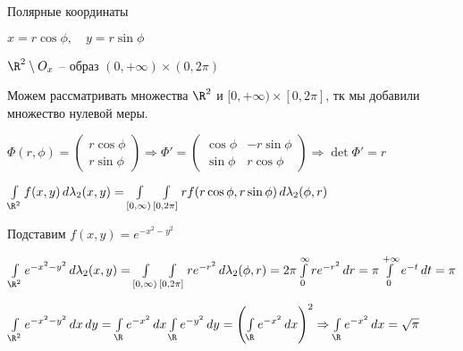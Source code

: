\begin{example}
	Полярные координаты 
	
	$x = r \cos \phi, \quad y = r \sin \phi$
	
	$\R^2 \setminus O_x$ -- образ $(0, +\infty) \times (0, 2\pi)$
	
	Можем рассматривать множества $\R^2$ и $[0, +\infty) \times [0, 2\pi]$, тк мы добавили множество нулевой меры.
	
	$\Phi(r, \phi) = \begin{pmatrix}
	r \cos \phi \\
	r \sin \phi
	\end{pmatrix} \Rightarrow \Phi' = \begin{pmatrix}
	\cos \phi & - r\sin\phi\\
	\sin \phi & r\cos \phi
	\end{pmatrix} \Rightarrow \det \Phi' = r$
	
	$\int\limits_{\R^2} f(x, y) \,d\lambda_2(x, y) = \int\limits_{[0, \infty)} \int\limits_{[0, 2\pi]} r f(r\cos \phi, r \sin \phi) \,d\lambda_2(\phi, r)$
	
	Подставим $f(x, y) = e^{-x^2-y^2}$

	$\int\limits_{\R^2} e^{-x^2-y^2} \,d\lambda_2(x, y) = \int\limits_{[0, \infty)} \int\limits_{[0, 2\pi]} r e^{-r^2} \,d\lambda_2(\phi, r) = 2\pi \int\limits_0^\infty r e^{-r^2} \,dr = \pi \int\limits_{0}^{+\infty} e^{-t}\,dt = \pi$
	
	$\int\limits_{\R^2} e^{-x^2-y^2} \,dx\,dy = \int\limits_{\R} e^{-x^2} \,dx \int\limits_{\R} e^{-y^2} \,dy = \left(\int\limits_{\R} e^{-x^2} \,dx \right)^2 \Rightarrow\int\limits_{\R} e^{-x^2} \,dx = \sqrt{\pi}$

\end{example}

